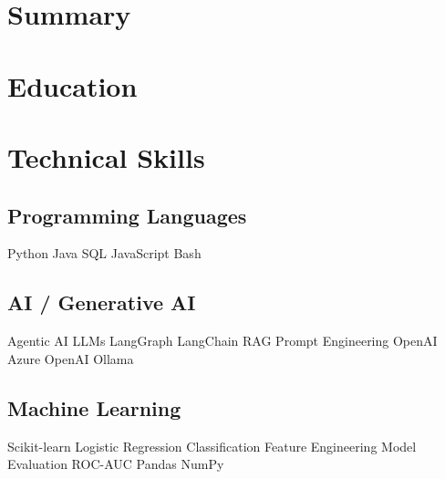 \documentclass[letterpaper]{deedy-resume} %
\begin{document}
\begin{minipage}[t]{0.33\textwidth} %

\section{Summary}
\section{Education} 


\section{Technical Skills}

\subsection{Programming Languages}
Python \textbullet{} Java \textbullet{} SQL \textbullet{} JavaScript \textbullet{} Bash

\subsection{AI / Generative AI}
Agentic AI \textbullet{} LLMs \textbullet{} LangGraph \textbullet{} LangChain \textbullet{} RAG \textbullet{} Prompt Engineering \textbullet{} OpenAI \textbullet{} Azure OpenAI \textbullet{} Ollama

\subsection{Machine Learning}
Scikit-learn \textbullet{} Logistic Regression \textbullet{} Classification \textbullet{} Feature Engineering \textbullet{} Model Evaluation \textbullet{} ROC-AUC \textbullet{} Pandas \textbullet{} NumPy


\end{minipage}
\end{document}
